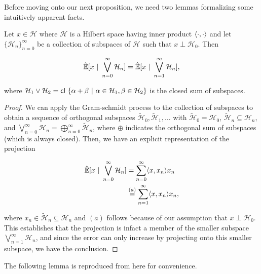 \documentclass[12pt]{article}
\def\H{\mathcal{H}}  %
\newcommand{\linE}[2]{\hat{\E}[#1\ |\ #2]}  %
\begin{document}
Before moving onto our next proposition, we need two lemmas formalizing
some intuitively apparent facts.

\begin{lemma}
  \label{lem:subspace_sum_projection}
  Let $x \in \H$ where $\H$ is a Hilbert space having inner product $\langle \cdot, \cdot \rangle$ and let $\{\H_n\}_{n = 0}^\infty$ be a collection of subspaces of $\H$ such that $x \perp \H_0$.  Then

  \begin{equation*}
    \linE{x}{\bigvee_{n = 0}^\infty\H_n} = \linE{x}{\bigvee_{n = 1}^\infty\H_n},
  \end{equation*}

  where $\H_1 \vee \H_2 = \cl \{\alpha + \beta\ |\ \alpha \in \H_1, \beta \in \H_2 \}$ is the closed sum of subspaces.
\end{lemma}
\begin{proof}
  We can apply the Gram-schmidt process to the collection of subspaces to obtain a sequence of orthogonal subspaces $\widetilde{\H}_0, \widetilde{\H}_1, \ldots$ with $\widetilde{\H}_0 = \H_0$, $\widetilde{\H}_n \subseteq \H_n$, and $\bigvee_{n = 0}^\infty\H_n = \bigoplus_{n = 0}^\infty \widetilde{\H}_n$, where $\oplus$ indicates the orthogonal sum of subspaces (which is always closed).  Then, we have an explicit representation of the projection

  \begin{align*}
    \linE{x}{\bigvee_{n = 0}^\infty\H_n} &= \sum_{n = 0}^\infty \inner{x}{x_n} x_n\\
    &\overset{(a)}{=} \sum_{n = 1}^\infty \inner{x}{x_n} x_n,
  \end{align*}

  where $x_n \in \widetilde{\H}_n \subseteq \H_n$ and $(a)$ follows because of our assumption that $x \perp \H_0$.  This establishes that the projection is infact a member of the smaller subspace $\bigvee_{n = 1}^\infty\H_n$, and since the error can only increase by projecting onto this smaller subspace, we have the conclusion.
\end{proof}

The following lemma is reproduced from \cite{lindquist} here for convenience.
\end{document}
